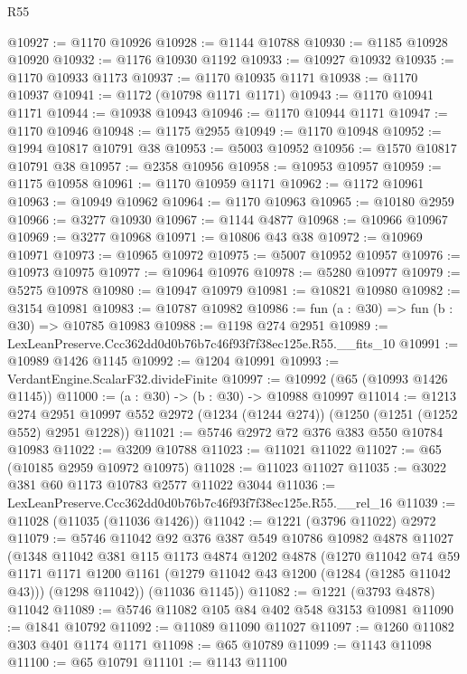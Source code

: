\begin{lexlean}{R55}
\begin{coremodule}
@10927 := @1170 @10926
@10928 := @1144 @10788
@10930 := @1185 @10928 @10920
@10932 := @1176 @10930 @1192
@10933 := @10927 @10932
@10935 := @1170 @10933 @1173
@10937 := @1170 @10935 @1171
@10938 := @1170 @10937
@10941 := @1172 (@10798 @1171 @1171)
@10943 := @1170 @10941 @1171
@10944 := @10938 @10943
@10946 := @1170 @10944 @1171
@10947 := @1170 @10946
@10948 := @1175 @2955
@10949 := @1170 @10948
@10952 := @1994 @10817 @10791 @38
@10953 := @5003 @10952
@10956 := @1570 @10817 @10791 @38
@10957 := @2358 @10956
@10958 := @10953 @10957
@10959 := @1175 @10958
@10961 := @1170 @10959 @1171
@10962 := @1172 @10961
@10963 := @10949 @10962
@10964 := @1170 @10963
@10965 := @10180 @2959
@10966 := @3277 @10930
@10967 := @1144 @4877
@10968 := @10966 @10967
@10969 := @3277 @10968
@10971 := @10806 @43 @38
@10972 := @10969 @10971
@10973 := @10965 @10972
@10975 := @5007 @10952 @10957
@10976 := @10973 @10975
@10977 := @10964 @10976
@10978 := @5280 @10977
@10979 := @5275 @10978
@10980 := @10947 @10979
@10981 := @10821 @10980
@10982 := @3154 @10981
@10983 := @10787 @10982
@10986 := fun (a : @30) => fun (b : @30) => @10785 @10983
@10988 := @1198 @274 @2951
@10989 := LexLeanPreserve.Ccc362dd0d0b76b7c46f93f7f38ec125e.R55.__fits_10
@10991 := @10989 @1426 @1145
@10992 := @1204 @10991
@10993 := VerdantEngine.ScalarF32.divideFinite
@10997 := @10992 (@65 (@10993 @1426 @1145))
@11000 := (a : @30) -> (b : @30) -> @10988 @10997
@11014 := @1213
    @274
    @2951
    @10997
    @552
    @2972
    (@1234 (@1244 @274))
    (@1250 (@1251 (@1252 @552) @2951 @1228))
@11021 := @5746 @2972 @72 @376 @383 @550 @10784 @10983
@11022 := @3209 @10788
@11023 := @11021 @11022
@11027 := @65 (@10185 @2959 @10972 @10975)
@11028 := @11023 @11027
@11035 := @3022 @381 @60 @1173 @10783 @2577 @11022 @3044
@11036 := LexLeanPreserve.Ccc362dd0d0b76b7c46f93f7f38ec125e.R55.__rel_16
@11039 := @11028 (@11035 (@11036 @1426))
@11042 := @1221 (@3796 @11022) @2972
@11079 := @5746
    @11042
    @92
    @376
    @387
    @549
    @10786
    @10982
    @4878
    @11027
    (@1348
      @11042
      @381
      @115
      @1173
      @4874
      @1202
      @4878
      (@1270
        @11042
        @74
        @59
        @1171
        @1171
        @1200
        @1161
        (@1279 @11042 @43 @1200 (@1284 (@1285 @11042 @43)))
        (@1298 @11042))
      (@11036 @1145))
@11082 := @1221 (@3793 @4878) @11042
@11089 := @5746 @11082 @105 @84 @402 @548 @3153 @10981
@11090 := @1841 @10792
@11092 := @11089 @11090 @11027
@11097 := @1260 @11082 @303 @401 @1174 @1171
@11098 := @65 @10789
@11099 := @1143 @11098
@11100 := @65 @10791
@11101 := @1143 @11100

\end{coremodule}
\end{lexlean}
